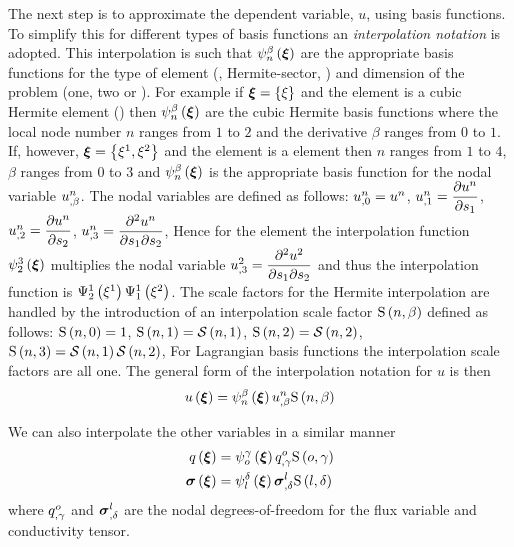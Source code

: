 The next step is to approximate the dependent variable, $u$, using basis
functions. To simplify this for different types of basis functions an
\emph{interpolation notation} is adopted. This interpolation is such that
$   \psi_{n}^{\beta} \left(  \boldsymbol{\xi}  \right)  $ are the appropriate basis functions for the
type of element (\eg \bicubicherm, Hermite-sector, \etc) and dimension of 
the problem (one, two or \threedal). For example if $ \boldsymbol{\xi} =\left\{ \xi \right\}$ 
and the element is a cubic Hermite element
() then $   \psi_{n}^{\beta} \left(  \boldsymbol{\xi}  \right)  $ 
are the cubic Hermite basis functions where the local node number $n$ ranges 
from $1$ to $2$ and the derivative $\beta$ ranges from $0$ to $1$. If,
however, $ \boldsymbol{\xi} =\left\{ \xi^{1},\xi^{2} \right\}$ and the element is a \bicubicherm 
element then $n$ ranges from $1$ to $4$, $\beta$ ranges from $0$ to $3$ and
$   \psi_{n}^{\beta} \left(  \boldsymbol{\xi}  \right)  $ is the appropriate basis function for the nodal
variable $  {u}^{n} _{,\beta} $. The nodal variables are defined as
follows: $  {u}^{n} _{,0} = {u}^{n} $,
$  {u}^{n} _{,1} = \dfrac{\partial  {u}^{n} }{\partial s_{1}} $,
$  {u}^{n} _{,2} = \dfrac{\partial  {u}^{n} }{\partial s_{2}} $,
$  {u}^{n} _{,3} = \dfrac{\partial^{2}  {u}^{n} }{\partial s_{1} \partial s_{2}} $,
\etc Hence for the \bicubicherm element the interpolation function
$   \psi_{2}^{3} \left(  \boldsymbol{\xi}  \right)  $ multiplies the nodal variable
$  {u}^{2} _{,3} = \dfrac{\partial^{2} u^{2}}{\partial s_{1} \partial s_{2}} $ and thus the
interpolation function is $   \Psi_{2}^{1} \left( \xi^{1} \right)     \Psi_{1}^{1} \left( \xi^{2} \right)  $.  The
scale factors for the Hermite interpolation are handled by the introduction of
an interpolation scale factor $   \mathrm{S} \left( n,\beta \right)  $ defined as follows:
$   \mathrm{S} \left( n,0 \right)  =1$, $   \mathrm{S} \left( n,1 \right)  =   \mathcal{S} \left( n,1 \right)  $, $   \mathrm{S} \left( n,2 \right)  =
   \mathcal{S} \left( n,2 \right)  $, $   \mathrm{S} \left( n,3 \right)  =   \mathcal{S} \left( n,1 \right)     \mathcal{S} \left( n,2 \right)  $,
\etc For Lagrangian basis functions the interpolation scale factors are all
one. The general form of the interpolation notation for $u$ is then
\begin{equation}
  \fnof{u}{\vectr{\xi}}=\gbfn{n}{\beta}{\vectr{\xi}}\nodedof{u}{n}{\beta}\gsf{n}{\beta}
  \label{eqn:uInterpolationLaplace}
\end{equation}

We can also interpolate the other variables in a similar manner \ie
\begin{equation}
  \begin{split}
     q\left(  \boldsymbol{\xi}  \right)  &=    \psi_{o}^{\gamma} \left(  \boldsymbol{\xi}  \right)    {q}^{o} _{,\gamma}    \mathrm{S} \left( o,\gamma \right)   \\
      \boldsymbol{\mathit{ \sigma }} \left(  \boldsymbol{\xi}  \right) 
    &=   \psi_{l}^{\delta} \left(  \boldsymbol{\xi}  \right)    { \boldsymbol{\mathit{ \sigma }} }^{l} _{,\delta}    \mathrm{S} \left( l,\delta \right)   \\
  \end{split}
\end{equation}
where $  {q}^{o} _{,\gamma} $ and $  { \boldsymbol{\mathit{ \sigma }} }^{l} _{,\delta} $ are the
nodal degrees-of-freedom for the flux variable and conductivity tensor.

